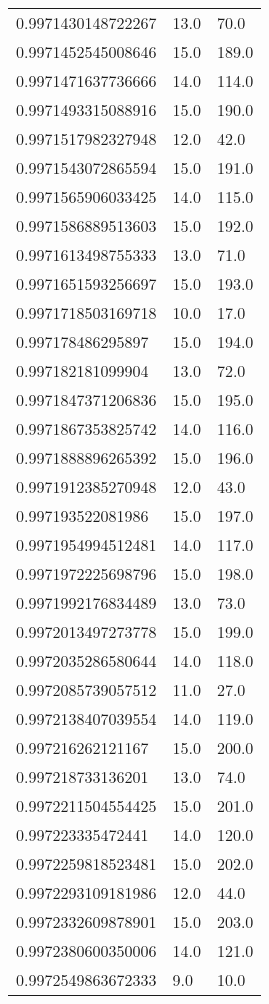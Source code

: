 \begin{center}
\begin{supertabular}[H]{p{0.30\textwidth}p{0.05\textwidth}p{0.05\textwidth}}
0.9971430148722267 & 13.0 & 70.0 \\ 
0.9971452545008646 & 15.0 & 189.0 \\ 
0.9971471637736666 & 14.0 & 114.0 \\ 
0.9971493315088916 & 15.0 & 190.0 \\ 
0.9971517982327948 & 12.0 & 42.0 \\ 
0.9971543072865594 & 15.0 & 191.0 \\ 
0.9971565906033425 & 14.0 & 115.0 \\ 
0.9971586889513603 & 15.0 & 192.0 \\ 
0.9971613498755333 & 13.0 & 71.0 \\ 
0.9971651593256697 & 15.0 & 193.0 \\ 
0.9971718503169718 & 10.0 & 17.0 \\ 
0.997178486295897 & 15.0 & 194.0 \\ 
0.997182181099904 & 13.0 & 72.0 \\ 
0.9971847371206836 & 15.0 & 195.0 \\ 
0.9971867353825742 & 14.0 & 116.0 \\ 
0.9971888896265392 & 15.0 & 196.0 \\ 
0.9971912385270948 & 12.0 & 43.0 \\ 
0.997193522081986 & 15.0 & 197.0 \\ 
0.9971954994512481 & 14.0 & 117.0 \\ 
0.9971972225698796 & 15.0 & 198.0 \\ 
0.9971992176834489 & 13.0 & 73.0 \\ 
0.9972013497273778 & 15.0 & 199.0 \\ 
0.9972035286580644 & 14.0 & 118.0 \\ 
0.9972085739057512 & 11.0 & 27.0 \\ 
0.9972138407039554 & 14.0 & 119.0 \\ 
0.997216262121167 & 15.0 & 200.0 \\ 
0.997218733136201 & 13.0 & 74.0 \\ 
0.9972211504554425 & 15.0 & 201.0 \\ 
0.997223335472441 & 14.0 & 120.0 \\ 
0.9972259818523481 & 15.0 & 202.0 \\ 
0.9972293109181986 & 12.0 & 44.0 \\ 
0.9972332609878901 & 15.0 & 203.0 \\ 
0.9972380600350006 & 14.0 & 121.0 \\ 
0.9972549863672333 & 9.0 & 10.0 \\ 

\end{supertabular}
\end{center}
